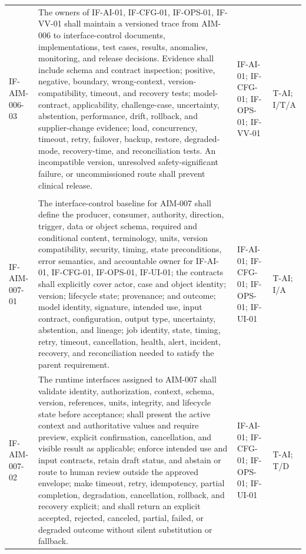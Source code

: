 \documentclass[11pt,letterpaper]{article}
\begin{document}
\begin{scriptsize}
\begin{longtable}{@{}L{0.14\textwidth}L{0.49\textwidth}L{0.19\textwidth}L{0.10\textwidth}@{}}
\addlinespace[2pt]
\mbox{IF-AIM-006-03} & The owners of IF-AI-01, IF-CFG-01, IF-OPS-01, IF-VV-01 shall maintain a versioned trace from AIM-006 to interface-control documents, implementations, test cases, results, anomalies, monitoring, and release decisions. Evidence shall include schema and contract inspection; positive, negative, boundary, wrong-context, version-compatibility, timeout, and recovery tests; model-contract, applicability, challenge-case, uncertainty, abstention, performance, drift, rollback, and supplier-change evidence; load, concurrency, timeout, retry, failover, backup, restore, degraded-mode, recovery-time, and reconciliation tests. An incompatible version, unresolved safety-significant failure, or uncommissioned route shall prevent clinical release. & IF-AI-01; IF-CFG-01; IF-OPS-01; IF-VV-01 & T-AI; I\slash\allowbreak{}T\slash\allowbreak{}A \\
\addlinespace[2pt]
 \\
\addlinespace[2pt]
\mbox{IF-AIM-007-01} & The interface-control baseline for AIM-007 shall define the producer, consumer, authority, direction, trigger, data or object schema, required and conditional content, terminology, units, version compatibility, security, timing, state preconditions, error semantics, and accountable owner for IF-AI-01, IF-CFG-01, IF-OPS-01, IF-UI-01; the contracts shall explicitly cover actor, case and object identity; version; lifecycle state; provenance; and outcome; model identity, signature, intended use, input contract, configuration, output type, uncertainty, abstention, and lineage; job identity, state, timing, retry, timeout, cancellation, health, alert, incident, recovery, and reconciliation needed to satisfy the parent requirement. & IF-AI-01; IF-CFG-01; IF-OPS-01; IF-UI-01 & T-AI; I\slash\allowbreak{}A \\
\addlinespace[2pt]
\mbox{IF-AIM-007-02} & The runtime interfaces assigned to AIM-007 shall validate identity, authorization, context, schema, version, references, units, integrity, and lifecycle state before acceptance; shall present the active context and authoritative values and require preview, explicit confirmation, cancellation, and visible result as applicable; enforce intended use and input contracts, retain draft status, and abstain or route to human review outside the approved envelope; make timeout, retry, idempotency, partial completion, degradation, cancellation, rollback, and recovery explicit; and shall return an explicit accepted, rejected, canceled, partial, failed, or degraded outcome without silent substitution or fallback. & IF-AI-01; IF-CFG-01; IF-OPS-01; IF-UI-01 & T-AI; T\slash\allowbreak{}D \\

\end{longtable}
\end{scriptsize}
\end{document}
